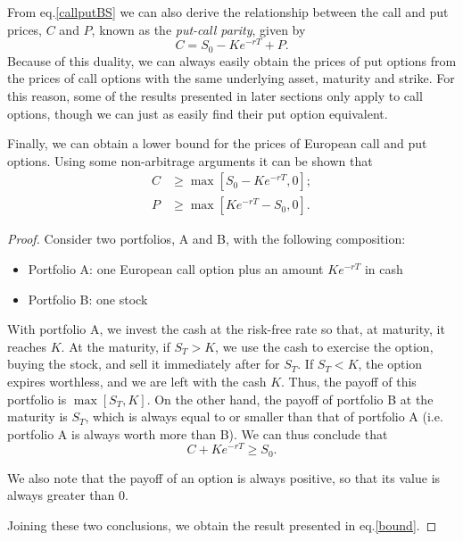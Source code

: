 From eq.\eqref{callputBS} we can also derive the relationship between the call and put prices, $C$ and $P$, known as the \emph{put-call parity}, given by
\begin{equation}
C=S_0-Ke^{-rT}+P.
\end{equation}
\noindent Because of this duality, we can always easily obtain the prices of put options from the prices of call options with the same underlying asset, maturity and strike. For this reason, some of the results presented in later sections only apply to call options, though we can just as easily find their put option equivalent.


Finally, we can obtain a lower bound for the prices of European call and put options. Using some non-arbitrage arguments it can be shown that
\begin{equation}\label{bound}
\begin{split}
C&\geq \max\left[S_0-Ke^{-rT},0\right];\\
P&\geq \max\left[Ke^{-rT}-S_0,0\right].
\end{split}
\end{equation}

\begin{proof}
Consider two portfolios, A and B, with the following composition:
\begin{itemize}
  \item[] Portfolio A: one European call option plus an amount $Ke^{-rT}$ in cash
  \item[] Portfolio B: one stock
\end{itemize}
With portfolio A, we invest the cash at the risk-free rate so that, at maturity, it reaches $K$. At the maturity, if $S_T>K$, we use the cash to exercise the option, buying the stock, and sell it immediately after for $S_T$. If $S_T<K$, the option expires worthless, and we are left with the cash $K$. Thus, the payoff of this portfolio is $\max[S_T,K]$. On the other hand, the payoff of portfolio B at the maturity is $S_T$, which is always equal to or smaller than that of portfolio A (i.e. portfolio A is always worth more than B). We can thus conclude that
\begin{equation}
C+Ke^{-rT}\geq S_0.
\end{equation}

We also note that the payoff of an option is always positive, so that its value is always greater than 0.

Joining these two conclusions, we obtain the result presented in eq.\eqref{bound}.
\end{proof}

